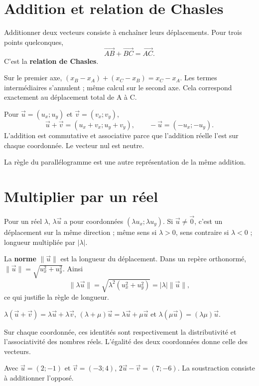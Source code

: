 \documentclass[../cours_2de.tex]{subfiles}
\begin{document}
\section{Addition et relation de Chasles}
Additionner deux vecteurs consiste à enchaîner leurs déplacements. Pour trois points quelconques,
\[
\overrightarrow{AB}+\overrightarrow{BC}=\overrightarrow{AC}.
\]
C'est la \textbf{relation de Chasles}.
\begin{demonstration}
Sur le premier axe, $(x_B-x_A)+(x_C-x_B)=x_C-x_A$. Les termes intermédiaires s'annulent ; même calcul sur le second axe. Cela correspond exactement au déplacement total de A à C.
\end{demonstration}
Pour $\vec u=(u_x;u_y)$ et $\vec v=(v_x;v_y)$,
\[
\vec u+\vec v=(u_x+v_x;u_y+v_y),\qquad
-\vec u=(-u_x;-u_y).
\]
L'addition est commutative et associative parce que l'addition réelle l'est sur chaque coordonnée. Le vecteur nul est neutre.
\begin{center}
\end{center}
La règle du parallélogramme est une autre représentation de la même addition.
\section{Multiplier par un réel}
Pour un réel $\lambda$, $\lambda\vec u$ a pour coordonnées $(\lambda u_x;\lambda u_y)$. Si $\vec u\ne\vec0$, c'est un déplacement sur la même direction ; même sens si $\lambda>0$, sens contraire si $\lambda<0$ ; longueur multipliée par $|\lambda|$.

La \textbf{norme} $\|\vec u\|$ est la longueur du déplacement. Dans un repère orthonormé, $\|\vec u\|=\sqrt{u_x^2+u_y^2}$. Ainsi
\[
\|\lambda\vec u\|=\sqrt{\lambda^2(u_x^2+u_y^2)}
=|\lambda|\|\vec u\|,
\]
ce qui justifie la règle de longueur.
\begin{propriete}
$\lambda(\vec u+\vec v)=\lambda\vec u+\lambda\vec v$,
$(\lambda+\mu)\vec u=\lambda\vec u+\mu\vec u$ et
$\lambda(\mu\vec u)=(\lambda\mu)\vec u$.
\end{propriete}
\begin{demonstration}
Sur chaque coordonnée, ces identités sont respectivement la distributivité et l'associativité des nombres réels. L'égalité des deux coordonnées donne celle des vecteurs.
\end{demonstration}
Avec $\vec u=(2;-1)$ et $\vec v=(-3;4)$, $2\vec u-\vec v=(7;-6)$. La soustraction consiste à additionner l'opposé.
\end{document}
